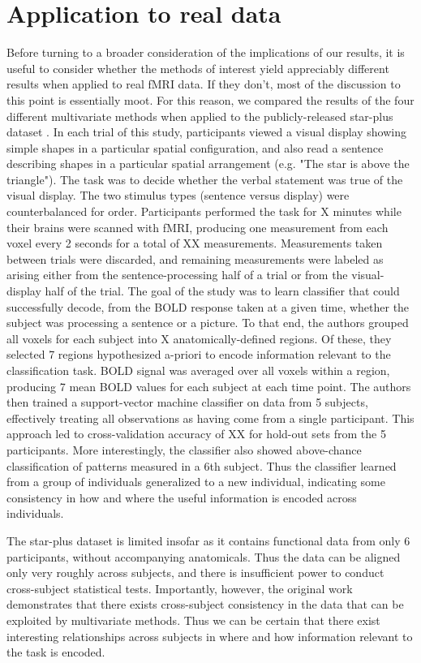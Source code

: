 \section{Application to real data}

Before turning to a broader consideration of the implications of our results, it is useful to consider whether the methods of interest yield appreciably different results when applied to real fMRI data. If they don't, most of the discussion to this point is essentially moot. For this reason, we compared the results of the four different multivariate methods when applied to the publicly-released star-plus dataset \cite{starplus}. In each trial of this study, participants viewed a visual display showing simple shapes in a particular spatial configuration, and also read a sentence describing shapes in a particular spatial arrangement (e.g. "The star is above the triangle"). The task was to decide whether the verbal statement was true of the visual display. The two stimulus types (sentence versus display) were counterbalanced for order. Participants performed the task for X minutes while their brains were scanned with fMRI, producing one measurement from each voxel every 2 seconds for a total of XX measurements. Measurements taken between trials were discarded, and remaining measurements were labeled as arising either from the sentence-processing half of a trial or from the visual-display half of the trial. The goal of the study was to learn classifier that could successfully decode, from the BOLD response taken at a given time, whether the subject was processing a sentence or a picture. To that end, the authors grouped all voxels for each subject into X anatomically-defined regions. Of these, they selected 7 regions hypothesized a-priori to encode information relevant to the classification task. BOLD signal was averaged over all voxels within a region, producing 7 mean BOLD values for each subject at each time point. The authors then trained a support-vector machine classifier on data from 5 subjects, effectively treating all observations as having come from a single participant. This approach led to cross-validation accuracy of XX for hold-out sets from the 5 participants. More interestingly, the classifier also showed above-chance classification of patterns measured in a 6th subject. Thus the classifier learned from a group of individuals generalized to a new individual, indicating some consistency in how and where the useful information is encoded across individuals.

The star-plus dataset is limited insofar as it contains functional data from only 6 participants, without accompanying anatomicals. Thus the data can be aligned only very roughly across subjects, and there is insufficient power to conduct cross-subject statistical tests. Importantly, however, the original work demonstrates that there exists cross-subject consistency in the data that can be exploited by multivariate methods. Thus we can be certain that there exist interesting relationships across subjects in where and how information relevant to the task is encoded.

